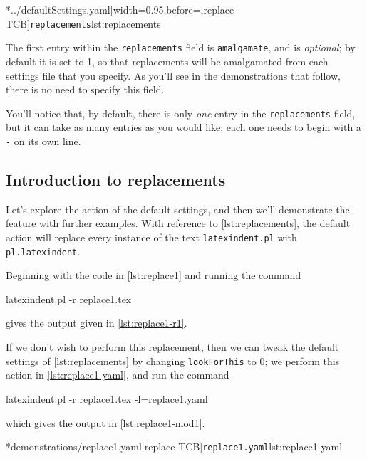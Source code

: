  \cmhlistingsfromfile*[style=replacements]*{../defaultSettings.yaml}[width=0.95\linewidth,before=\centering,replace-TCB]{\texttt{replacements}}{lst:replacements}

 The first entry within the \texttt{replacements} field is \texttt{amalgamate}, and
 is \emph{optional}; by default it is set to 1, so that replacements will be
 amalgamated from each settings file that you specify. As you'll see in the demonstrations
 that follow, there is no need to specify this field.

 You'll notice that, by default, there is only \emph{one} entry in the
 \texttt{replacements} field, but it can take as many entries as you would like; each
 one needs to begin with a \texttt{-} on its own line.

\subsection{Introduction to replacements}
	Let's explore the action of the default settings, and then we'll demonstrate the feature
	with further examples. With reference to \cref{lst:replacements}, the default action will
	replace every instance of the text \texttt{latexindent.pl} with \texttt{pl.latexindent}.

	Beginning with the code in \cref{lst:replace1} and running the command
	\begin{commandshell}
latexindent.pl -r replace1.tex
\end{commandshell}
	gives the output given in \cref{lst:replace1-r1}.

	\begin{cmhtcbraster}[raster column skip=.01\linewidth]
	\end{cmhtcbraster}

	If we don't wish to perform this replacement, then we can tweak the default settings of
	\vref{lst:replacements} by changing \texttt{lookForThis} to 0; we perform this action
	in \cref{lst:replace1-yaml}, and run the command
	\begin{commandshell}
latexindent.pl -r replace1.tex -l=replace1.yaml
\end{commandshell}
	which gives the output in \cref{lst:replace1-mod1}.

	\begin{cmhtcbraster}[raster column skip=.01\linewidth]
		\cmhlistingsfromfile*[style=yaml-LST]*{demonstrations/replace1.yaml}[replace-TCB]{\texttt{replace1.yaml}}{lst:replace1-yaml}
	\end{cmhtcbraster}

